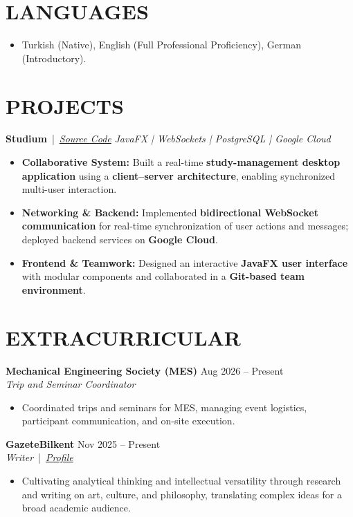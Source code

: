 \documentclass[11pt,a4paper]{article}
\begin{document}
\section{LANGUAGES}
\begin{itemize}
    \item[\textbullet] Turkish (Native), English (Full Professional Proficiency), German (Introductory).
\end{itemize}

\section{PROJECTS}
\vspace{5pt}
\noindent \textbf{Studium} \,|\, \textit{\href{https://github.com/boylebirkisi/CS102-Studium-App-Group-Project}{Source Code}}
\hfill \textit{JavaFX | WebSockets | PostgreSQL | Google Cloud}
\begin{itemize}
    \item[\textbullet] \textbf{Collaborative System:} Built a real-time \textbf{study-management desktop application} using a \textbf{client–server architecture}, enabling synchronized multi-user interaction.
    \item[\textbullet] \textbf{Networking \& Backend:} Implemented \textbf{bidirectional WebSocket communication} for real-time synchronization of user actions and messages; deployed backend services on \textbf{Google Cloud}.
    \item[\textbullet] \textbf{Frontend \& Teamwork:} Designed an interactive \textbf{JavaFX user interface} with modular components and collaborated in a \textbf{Git-based team environment}.
\end{itemize}

\section{EXTRACURRICULAR}
\noindent \textbf{Mechanical Engineering Society (MES)} \hfill Aug 2026 -- Present \\
\textit{Trip and Seminar Coordinator} 
\begin{itemize}
    \item[\textbullet] Coordinated trips and seminars for MES, managing event logistics, participant communication, and on-site execution.
\end{itemize}

\noindent \textbf{GazeteBilkent} \hfill Nov 2025 -- Present \\
\textit{Writer} \,|\, \textit{\href{https://gazetebilkent.com/author/delfineryilmaz/}{Profile}}
\begin{itemize}
    \item[\textbullet] Cultivating analytical thinking and intellectual versatility through research and writing on art, culture, and philosophy, translating complex ideas for a broad academic audience.
\end{itemize}
\end{document}
